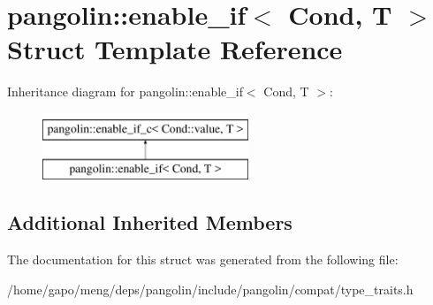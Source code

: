 \hypertarget{structpangolin_1_1enable__if}{}\section{pangolin\+:\+:enable\+\_\+if$<$ Cond, T $>$ Struct Template Reference}
\label{structpangolin_1_1enable__if}
Inheritance diagram for pangolin\+:\+:enable\+\_\+if$<$ Cond, T $>$\+:\begin{figure}[H]
\begin{center}
\leavevmode
\includegraphics[height=2.000000cm]{structpangolin_1_1enable__if}
\end{center}
\end{figure}
\subsection*{Additional Inherited Members}


The documentation for this struct was generated from the following file\+:\begin{DoxyCompactItemize}
\item 
/home/gapo/meng/deps/pangolin/include/pangolin/compat/type\+\_\+traits.\+h\end{DoxyCompactItemize}
